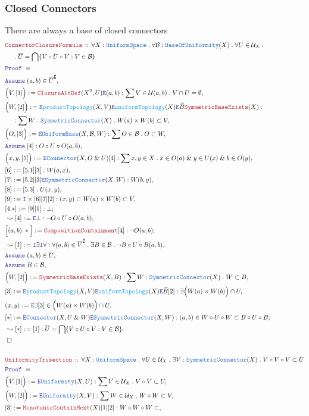 \documentclass[12pt]{scrartcl}
\newcommand{\TYPE}[1]{\textcolor{NavyBlue}{\mathtt{#1}}}
\newcommand{\FUNC}[1]{\textcolor{Cerulean}{\mathtt{#1}}}
\newcommand{\LOGIC}[1]{\textcolor{Blue}{\mathtt{#1}}}
\newcommand{\THM}[1]{\textcolor{Maroon}{\mathtt{#1}}}
\renewcommand{\.}{\; . \;}
\newcommand{\de}{: \kern 0.1pc =}
\newcommand{\Theorem}[2]{& \THM{#1} \, :: \, #2 \\ & \Proof = \\ }
\newcommand{\NewLine}{\\ & \kern 1pc}
\newcommand{\Page}[1]{ \begin{align*} #1 \end{align*}   }
\renewcommand{\And}{\; \& \;}
\renewcommand{\c}{\complement}
\newcommand{\Say}[3]{& #1 \de #2 : #3, \\}
\newcommand{\SayIn}[3]{& #1 \de #2 \in #3, \\}
\newcommand{\Conclude}[3]{& #1 \de #2 : #3; \\}
\newcommand{\Derive}[3]{& \leadsto #1 \de #2 : #3, \\}
\newcommand{\DeriveConclude}[3]{& \leadsto #1 \de #2 : #3 ; \\}
\newcommand{\Assume}[2]{& \LOGIC{Assume} \; #1 : #2, \\}
\newcommand{\AssumeIn}[2]{& \LOGIC{Assume} \; #1 \in #2, \\}
\newcommand{\Intro}{\LOGIC{I}}
\newcommand{\Elim}{\LOGIC{E}}
\newcommand{\QED}{\; \square}
\newcommand{\EndProof}{& \QED \\}
\newcommand{\Proof}{\LOGIC{Proof} \; }
\newcommand{\B}{\mathcal{B}}
\renewcommand{\U}{\mathcal{U}}
\newcommand{\Connector}{\TYPE{Connector}}
\newcommand{\Unif}{\TYPE{Uniformity}}
\newcommand{\US}{\TYPE{UniformSpace}}
\newcommand{\UB}{\TYPE{UniformBase}}
\newcommand{\Sym}{\TYPE{SymmetricConnector}}
\newcommand{\BofU}{\TYPE{BaseOfUniformity}}
\begin{document}
\subsubsection{Closed Connectors}
There are always a base of closed connectors
\Page{
	\Theorem{ConnectorClosureFormula}
	{
		\forall X : \US \.
		\forall \B : \BofU(X) \.
		\forall U \in \U_X \. \NewLine \. 
		\overline{U} = \bigcap \{ V \circ U \circ V : V \in \B  \}
	}
	\AssumeIn{(a,b)}{\overline{U}^\c}
	\Say{\Big(V,[1]\Big)}{\THM{ClosureAltDef}(X^2,U)\Elim (a,b)}
	{
		\sum V \in  \U(a,b) \.  V \cap U = \emptyset 
	}
	\Say{\Big(W,[2]\Big)}
	{
		\Elim \FUNC{productTopology}(X,V)		
		\Elim \FUNC{uniformTopology}(X)
		\Elim \widetilde{B} 
		\THM{SymmetricBaseExists}(X)
	}
	{
		\NewLine	:	
		\sum W : \Sym(X) \.
		W(a) \times W(b) \subset V
	}
	\Say{\Big(O,[3]\Big)}{\Elim \UB(X,\B,W)}
	{
		\sum O \in \B \. O \subset W
	}
	\Assume{[4]}{O \circ U \circ O(a,b)}
	\Say{\Big(x,y,[5]\Big)}{\Elim \Connector(X,O \And U)[4]}
	{
		\sum x,y \in X \.
		x \in O(a) \And y \in U(x) \And b \in O(y)
	}
	\Say{[6]}{[5.1][3]}{W(a,x)}
	\Say{[7]}{[5.2][3]\Elim \Sym (X,W)}{W(b,y)}
	\Say{[8]}{[5.3]}{U(x,y)}
	\Say{[9]}{\Intro \times [6][7][2]}{(x,y) \subset W(a) \times W(b) \subset V }
	\Conclude{[4.*]}{[9][1]}{\bot}		
	\Derive{[4]}{\Elim \bot}
	{
		\neg O \circ U \circ O (a,b) 
	}
	\Conclude{\Big[(a,b).*\Big]}{\THM{CompositionContainment}[4]}{\neg O(a,b)}
	\Derive{[1]}{\Intro \exists \Intro \forall }
	{
		\forall (a,b) \in \overline{V}^\c \. 
		\exists B \in \B \.
		\neg B \circ U \circ B(a,b) 	
	}
	\AssumeIn{(a,b)}{\overline{U}}
	\AssumeIn{B}{\B}
	\Say{\Big(W,[2]\Big)}
	{
		\THM{SymmetricBaseExists}(X,B)
	}
	{
		\sum W : \Sym(X) \.
		W \subset B
	}
	\Say{[3]}{\Elim \FUNC{productTopology}(X,V)		
		\Elim \FUNC{uniformTopology}(X)
		\Elim \widetilde{B} [2]}
	{
		\exists \Big(W(a) \times W(b)\Big) \cap U
	}
	\SayIn{(x,y)}{\Elim \exists [3]}
	{
		\Big(W(a) \times W(b)\Big) \cap U
	}
	\Conclude{[*]}{\Elim \Connector(X,U\And W)\Elim \Sym(X,W) }
	{
		(a,b) \in   W \circ U \circ W \subset B \circ U \circ B
	}
	\DeriveConclude{[*]}{[1]}
	{
			\overline{U} = \bigcap \{ V \circ U \circ V : V \in \B  \}
	}
	\EndProof
	\\
	\Theorem{UniformityTrisection}
	{
		\forall X : \US \. 
		\forall U \in \U_X \.
		\exists V : \Sym(X) \.
		V \circ V \circ V \subset U	
	}
	\Say{\Big(V,[1]\Big)}{\Elim \Unif(X,U)}
	{
		\sum V \in \U_X \.   V \circ V \subset U
	}
	\Say{\Big(W,[2]\Big)}{\Elim \Unif(X,V)}
	{
		\sum W \in \U_X \.   W \circ W \subset V
	}
	\Say{[3]}{\THM{MonotonicContainMent}(X)[1][2]}
	{
		W \circ W \circ W \subset  
}}
\end{document}
